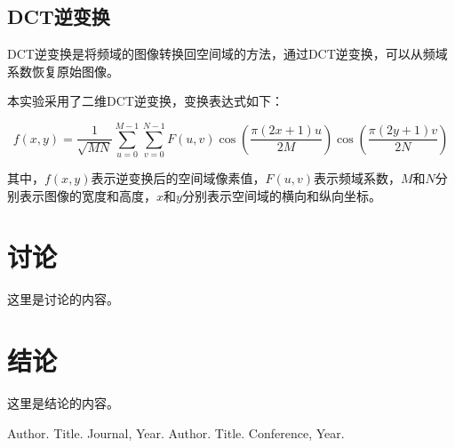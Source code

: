 \documentclass{article}
\begin{document}
\subsection{DCT逆变换}

DCT逆变换是将频域的图像转换回空间域的方法，通过DCT逆变换，可以从频域系数恢复原始图像。

本实验采用了二维DCT逆变换，变换表达式如下：

\[
f(x,y) = \frac{1}{\sqrt{MN}} \sum_{u=0}^{M-1} \sum_{v=0}^{N-1} F(u,v) \cos\left(\frac{\pi(2x+1)u}{2M}\right) \cos\left(\frac{\pi(2y+1)v}{2N}\right)
\]

其中，$f(x,y)$表示逆变换后的空间域像素值，$F(u,v)$表示频域系数，$M$和$N$分别表示图像的宽度和高度，$x$和$y$分别表示空间域的横向和纵向坐标。


\section{讨论}

这里是讨论的内容。

\section{结论}

这里是结论的内容。

\begin{thebibliography}{9}
 Author. Title. Journal, Year.
 Author. Title. Conference, Year.
\end{thebibliography}
\end{document}
